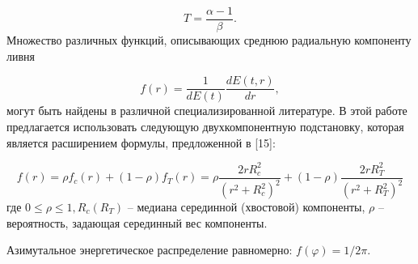 \begin{equation}\label{eq:scalePar}
T = \frac{\alpha - 1}{\beta}.
\end{equation}
Множество различных функций, описывающих среднюю радиальную компоненту ливня

\begin{equation}\label{eq:radProf}
f(r) = \frac{1}{dE(t)}\frac{dE(t,r)}{dr},
\end{equation}
могут  быть  найдены  в  различной специализированной литературе. В  этой работе   предлагается   использовать   следующую   двухкомпонентную подстановку, которая является расширением формулы, предложенной в [15]:

\begin{equation}\label{eq:ansatz}
f(r)
= \rho f_c(r)
+ (1 - \rho)f_T(r)
= \rho \frac{2rR_c^2}{ (r^2 + R_c^2)^2 }
+ (1 - \rho) \frac{ 2rR_T^2}{ (r^2 + R_T^2)^2 }
\end{equation}
где $0 \leq \rho \leq 1, R_c(R_T)$ -- медиана серединной (хвостовой) компоненты, $\rho$ -- вероятность, задающая серединный вес компоненты.

Азимутальное энергетическое распределение равномерно: $f(\varphi) = 1/{2\pi}$.
